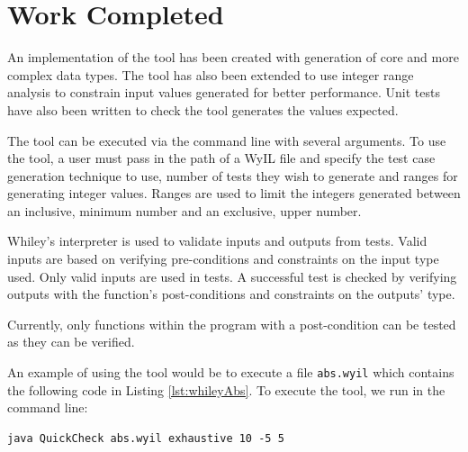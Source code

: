 \section{Work Completed}\label{section:work}



An implementation of the tool has been created with generation of core and more complex data types. 
The tool has also been extended to use integer range analysis to constrain input values generated for better performance. 
Unit tests have also been written to check the tool generates the values expected.

The tool can be executed via the command line with several arguments. To use the tool, a user must pass in the path of a WyIL file and specify the test case generation technique to use, number of tests they wish to generate and ranges for generating integer values. Ranges are used to limit the integers generated between an inclusive, minimum number and an exclusive, upper number.

Whiley's interpreter is used to validate inputs and outputs from tests. Valid inputs are based on verifying pre-conditions and constraints on the input type used. Only valid inputs are used in tests. A successful test is checked by verifying outputs with the function's post-conditions and constraints on the outputs' type.


Currently, only functions within the program with a post-condition can be tested as they can be verified.

An example of using the tool would be to execute a file \texttt{abs.wyil} which contains the following code in Listing \ref{lst:whileyAbs}.
To execute the tool, we run in the command line: 
\begin{verbatim}
java QuickCheck abs.wyil exhaustive 10 -5 5
\end{verbatim}

